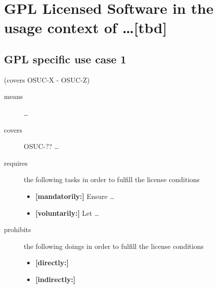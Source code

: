 %
%
%
%
%



\section{GPL Licensed Software in the usage context of \ldots [tbd]}
\label{OSUC-01-GPL} \label{OSUC-03-GPL} 
\label{OSUC-06-GPL} \label{OSUC-09-GPL}

\label{OSUC-02-GPL} \label{OSUC-04-GPL} \label{OSUC-05-GPL}
\label{OSUC-07-GPL} \label{OSUC-08-GPL} \label{OSUC-10-GPL}


\subsection{GPL specific use case 1}
(covers OSUC-X - OSUC-Z)
\begin{description}
\item[means] \ldots

\item[covers] OSUC-?? \ldots

\item[requires] the following tasks in order to fulfill the license conditions
\begin{itemize}
  \item \textbf{[mandatorily:]} Ensure \ldots
  \item \textbf{[voluntarily:]} Let \ldots
\end{itemize}

\item[prohibits] the following doings in order to fulfill the license conditions
\begin{itemize}
  \item \textbf{[directly:]} 
  \item \textbf{[indirectly:]}
\end{itemize}
\end{description}

